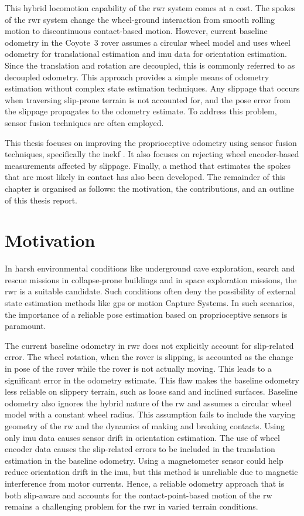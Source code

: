 \documentclass[report.tex]{subfiles}
\begin{document}
    This hybrid locomotion capability of the \gls{rwr} system comes at a cost. The spokes of the \gls{rwr} system change the wheel-ground interaction from smooth rolling motion to discontinuous contact-based motion. However, current baseline odometry in the Coyote~3 rover assumes a circular wheel model and uses wheel odometry for translational estimation and \gls{imu} data for orientation estimation. Since the translation and rotation are decoupled, this is commonly referred to as decoupled odometry. This approach provides a simple means of odometry estimation without complex state estimation techniques. Any slippage that occurs when traversing slip-prone terrain is not accounted for, and the pose error from the slippage propagates to the odometry estimate. To address this problem, sensor fusion techniques are often employed.
    
    This thesis focuses on improving the proprioceptive odometry using sensor fusion techniques, specifically the \gls{inekf} \cite{Hartley2018ContactAidedInEKF}. It also focuses on rejecting wheel encoder-based measurements affected by slippage. Finally, a method that estimates the spokes that are most likely in contact has also been developed. The remainder of this chapter is organised as follows: the motivation, the contributions, and an outline of this thesis report.

    \section{Motivation}
    
    In harsh environmental conditions like underground cave exploration, search and rescue missions in collapse-prone buildings and in space exploration missions, the \gls{rwr} is a suitable candidate. Such conditions often deny the possibility of external state estimation methods like \gls{gps} or motion Capture Systems. In such scenarios, the importance of a reliable pose estimation based on proprioceptive sensors is paramount.
    
    The current baseline odometry in \gls{rwr} does not explicitly account for slip-related error. The wheel rotation, when the rover is slipping, is accounted as the change in pose of the rover while the rover is not actually moving. This leads to a significant error in the odometry estimate. This flaw makes the baseline odometry less reliable on slippery terrain, such as loose sand and inclined surfaces. Baseline odometry also ignores the hybrid nature of the \gls{rw} and assumes a circular wheel model with a constant wheel radius. This assumption fails to include the varying geometry of the \gls{rw} and the dynamics of making and breaking contacts. Using only \gls{imu} data causes sensor drift in orientation estimation. The use of wheel encoder data causes the slip-related errors to be included in the translation estimation in the baseline odometry. Using a magnetometer sensor could help reduce orientation drift in the \gls{imu}, but this method is unreliable due to magnetic interference from motor currents. Hence, a reliable odometry approach that is both slip-aware and accounts for the contact-point-based motion of the \gls{rw} remains a challenging problem for the \gls{rwr} in varied terrain conditions.
    
\end{document}
